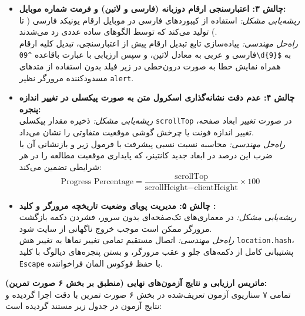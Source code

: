\documentclass[12pt]{exam}
\begin{document}
\begin{questions}
\begin{itemize}
    \item \textbf{چالش ۳: اعتبارسنجی ارقام دوزبانه (فارسی و لاتین) و فرمت شماره موبایل:}
    \\
    \textit{ریشه‌یابی مشکل:} استفاده از کیبوردهای فارسی در موبایل ارقام یونیکد فارسی ( تا ) تولید می‌کند که توسط الگوهای ساده عددی رد می‌شدند.
    \\
    \textit{راه‌حل مهندسی:} پیاده‌سازی تابع تبدیل ارقام پیش از اعتبارسنجی، تبدیل کلیه ارقام فارسی و عربی به معادل لاتین، و سپس ارزیابی با عبارت باقاعده \texttt{\textasciicircum09\textbackslash d\{9\}\$} به همراه نمایش خطا به صورت درون‌خطی در زیر فیلد بدون استفاده از متدهای مسدودکننده مرورگر نظیر \texttt{alert}.

    \item \textbf{چالش ۴: عدم دقت نشانه‌گذاری اسکرول متن به صورت پیکسلی در تغییر اندازه پنجره:}
    \\
    \textit{ریشه‌یابی مشکل:} ذخیره مقدار پیکسلی \texttt{scrollTop} در صورت تغییر ابعاد صفحه، تغییر اندازه فونت یا چرخش گوشی موقعیت متفاوتی را نشان می‌داد.
    \\
    \textit{راه‌حل مهندسی:} محاسبه نسبت نسبی پیشرفت با فرمول زیر و بازنشانی آن با ضرب این درصد در ابعاد جدید کانتینر، که پایداری موقعیت مطالعه را در هر شرایطی تضمین می‌کند:
    \[
    \text{Progress Percentage} = \frac{\text{scrollTop}}{\text{scrollHeight} - \text{clientHeight}} \times 100
    \]

    \item \textbf{چالش ۵: مدیریت پویای وضعیت تاریخچه مرورگر و کلید :}
    \\
    \textit{ریشه‌یابی مشکل:} در معماری‌های تک‌صفحه‌ای بدون سرور، فشردن دکمه بازگشت مرورگر ممکن است موجب خروج ناگهانی از سایت شود.
    \\
    \textit{راه‌حل مهندسی:} اتصال مستقیم تمامی تغییر نماها به تغییر هش \texttt{location.hash}، پشتیبانی کامل از دکمه‌های جلو و عقب مرورگر، و بستن پنجره‌های دیالوگ با کلید \texttt{Escape} با حفظ فوکوس المان فراخواننده.
\end{itemize}



\newpage

\question
\textbf{ماتریس ارزیابی و نتایج آزمون‌های نهایی (منطبق بر بخش ۶ صورت تمرین):}
\\
تمامی ۷ سناریوی آزمون تعریف‌شده در بخش ۶ صورت تمرین با دقت اجرا گردیده و نتایج آزمون در جدول زیر مستند گردیده است:


\end{questions}
\end{document}
